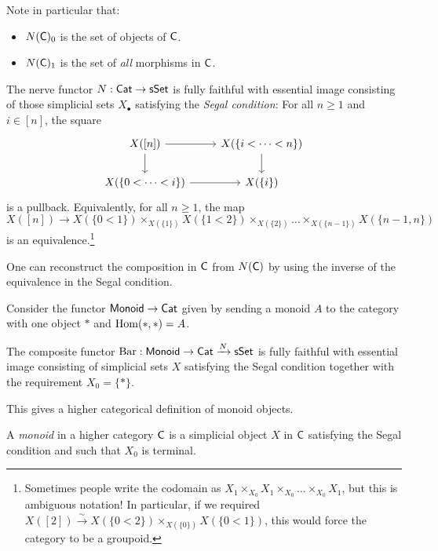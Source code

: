 \documentclass{article}
\begin{document}
Note in particular that:
\begin{itemize}
	\item $N(\mathsf{C})_0$ is the set of objects of $\mathsf{C}$.
	\item $N(\mathsf{C})_1$ is the set of \emph{all} morphisms in $\mathsf{C}$.
\end{itemize}

\begin{thm}[Grothendieck]
	The nerve functor $N: \mathsf{Cat} \to \mathsf{sSet}$ is fully faithful with essential image consisting of those simplicial sets $X_\bullet$ satisfying the \emph{Segal condition}:
	For all $n \geq 1$ and $i \in [n]$, the square
	\[
		\begin{tikzcd}
			X([n]) \rar \dar & X(\{i < \dots < n \}) \dar \\
			X(\{ 0 < \dots < i \}) \rar & X(\{ i \})
		\end{tikzcd}
	\]
	is a pullback.
	Equivalently, for all $n \geq 1$, the map $X([n]) \to X(\{0 < 1\}) \times_{X(\{1\})} X(\{1 < 2\}) \times_{X(\{2\})} \dots \times_{X(\{n-1\})} X(\{n-1,n\})$ is an equivalence.\footnote{
		Sometimes people write the codomain as $X_1 \times_{X_0} X_1 \times_{X_0} \dots \times_{X_0} X_1$, but this is ambiguous notation!
		In particular, if we required $X([2]) \xrightarrow{\sim} X(\{0 < 2\}) \times_{X(\{0\})} X(\{0 < 1\})$, this would force the category to be a groupoid.}
\end{thm}

One can reconstruct the composition in $\mathsf{C}$ from $N(\mathsf{C})$ by using the inverse of the equivalence in the Segal condition.

Consider the functor $\mathsf{Monoid} \to \mathsf{Cat}$ given by sending a monoid $A$ to the category with one object $*$ and $\operatorname{Hom}(*, *) = A$.

\begin{cor}[Milnor]
	The composite functor $\operatorname{Bar}: \mathsf{Monoid} \to \mathsf{Cat} \xrightarrow{N} \mathsf{sSet}$ is fully faithful with essential image consisting of simplicial sets $X$ satisfying the Segal condition together with the requirement $X_0 = \{ * \}$.
\end{cor}

This gives a higher categorical definition of monoid objects.

\begin{dfn}
	A \emph{monoid} in a higher category $\mathsf{C}$ is a simplicial object $X$ in $\mathsf{C}$ satisfying the Segal condition and such that $X_0$ is terminal.
\end{dfn}
\end{document}
